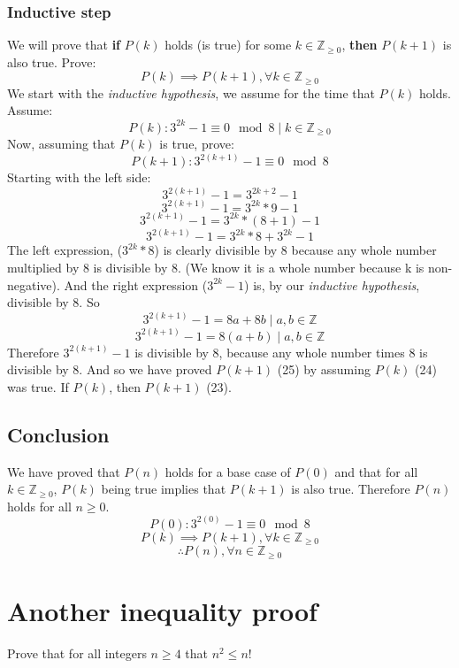 \documentclass{article}
\begin{document}
\subsubsection{Inductive step}
We will prove that \textbf{if} $P(k)$ holds (is true) for some $k \in \mathbb Z_{\ge 0}$, \textbf{then} $P(k + 1)$ is also true. Prove:
\begin{equation}
P(k) \implies P(k + 1), \forall k \in \mathbb Z_{\ge 0}
\end{equation}
We start with the \textit{inductive hypothesis}, we assume for the time that $P(k)$ holds. Assume:
\begin{equation}
P(k): 3^{2k} - 1 \equiv 0 \mod 8 \mid k \in \mathbb Z_{\ge 0}
\end{equation}
Now, assuming that $P(k)$ is true, prove:
\begin{equation}
P(k + 1): 3^{2(k + 1)} - 1 \equiv 0 \mod 8
\end{equation}
Starting with the left side:
\[ 3^{2(k + 1)} - 1 = 3^{2k + 2} - 1 \]
\[ 3^{2(k + 1)} - 1 = 3^{2k} * 9 - 1 \]
\[ 3^{2(k + 1)} - 1 = 3^{2k} * (8 + 1) - 1 \]
\[ 3^{2(k + 1)} - 1 = 3^{2k} * 8 + 3^{2k} - 1 \]
The left expression, ($3^{2k} * 8$) is clearly divisible by 8 because any whole number multiplied by 8 is divisible by 8. (We know it is a whole number because k is non-negative). And the right expression ($3^{2k} - 1$) is, by our \textit{inductive hypothesis}, divisible by 8. So
\[ 3^{2(k + 1)} - 1 = 8a + 8b \mid a,b \in \mathbb Z\]
\[ 3^{2(k + 1)} - 1 = 8(a + b) \mid a,b \in \mathbb Z\]
Therefore $3^{2(k + 1)} - 1$ is divisible by 8, because any whole number times 8 is divisible by 8. And so we have proved $P(k + 1)$ (25) by assuming $P(k)$ (24) was true. If $P(k)$, then $P(k + 1)$ (23).

\subsection{Conclusion}
We have proved that $P(n)$ holds for a base case of $P(0)$ and that for all $k \in \mathbb Z_{\ge 0}$, $P(k)$ being true implies that $P(k + 1)$ is also true. Therefore $P(n)$ holds for all $n \ge 0$.
\[P(0): 3^{2(0)} - 1 \equiv 0 \mod 8 \]
\[P(k) \implies P(k + 1), \forall k \in \mathbb Z_{\ge 0}\]
\[ \therefore P(n), \forall n \in \mathbb Z_{\ge 0} \]



\section{Another inequality proof}
Prove that for all integers \( n \geq 4 \) that \( n^2 \leq n! \)
\end{document}
